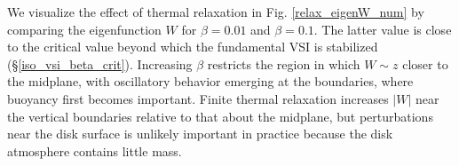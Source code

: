 





We visualize the effect of thermal relaxation in 
Fig. \ref{relax_eigenW_num} by comparing the eigenfunction $W$ for
$\beta=0.01$ and $\beta=0.1$. The latter value is close to the
critical value beyond which the fundamental VSI is stabilized
(\S\ref{iso_vsi_beta_crit}). Increasing $\beta$ 
restricts  the region in which $W\sim z$ closer to the midplane, with
oscillatory behavior emerging at the boundaries, where buoyancy first
becomes important. Finite thermal relaxation increases $|W|$ near the
vertical boundaries relative to that about the midplane, but
perturbations near the disk surface is unlikely important in practice
because the disk atmosphere contains little mass. 


